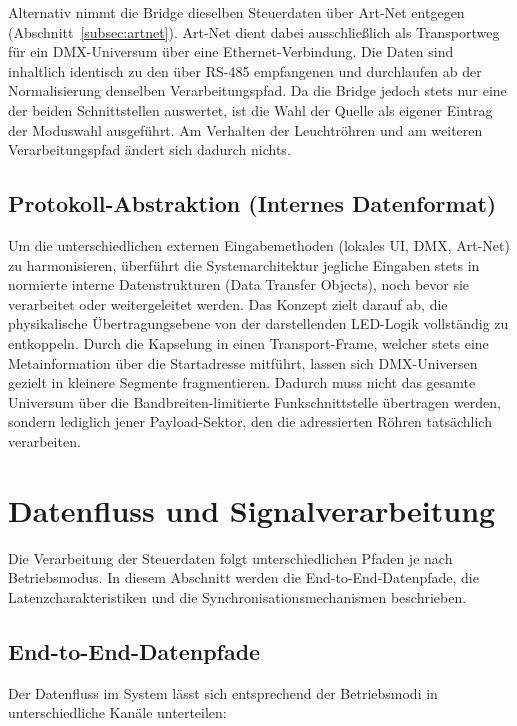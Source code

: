 Alternativ nimmt die Bridge dieselben Steuerdaten über Art-Net entgegen
(Abschnitt~\ref{subsec:artnet}). Art-Net dient dabei ausschließlich als
Transportweg für ein DMX-Universum über eine Ethernet-Verbindung. Die Daten sind
inhaltlich identisch zu den über RS-485 empfangenen und durchlaufen ab der
Normalisierung denselben Verarbeitungspfad. Da die Bridge jedoch stets nur eine der beiden
Schnittstellen auswertet, ist die Wahl der Quelle als eigener Eintrag der Moduswahl
ausgeführt. Am Verhalten der Leuchtröhren und am weiteren Verarbeitungspfad ändert sich
dadurch nichts.

\subsection{Protokoll-Abstraktion (Internes Datenformat)}
\label{subsec:internes-protokoll}

Um die unterschiedlichen externen Eingabemethoden (lokales UI, DMX, Art-Net) zu harmonisieren, überführt die Systemarchitektur 
jegliche Eingaben stets in normierte interne Datenstrukturen (Data Transfer Objects), noch bevor sie verarbeitet oder weitergeleitet werden. 
Das Konzept zielt darauf ab, die physikalische Übertragungsebene von der darstellenden LED-Logik vollständig zu entkoppeln.
Durch die Kapselung in einen Transport-Frame, welcher stets eine Metainformation über die Startadresse mitführt, 
lassen sich DMX-Universen gezielt in kleinere Segmente fragmentieren. 
Dadurch muss nicht das gesamte Universum über die Bandbreiten-limitierte Funkschnittstelle übertragen werden, 
sondern lediglich jener Payload-Sektor, den die adressierten Röhren tatsächlich verarbeiten.

\section{Datenfluss und Signalverarbeitung}
\label{sec:datenfluss-und-signalverarbeitung}

Die Verarbeitung der Steuerdaten folgt unterschiedlichen Pfaden je nach Betriebsmodus. 
In diesem Abschnitt werden die End-to-End-Datenpfade, die Latenzcharakteristiken und die 
Synchronisationsmechanismen beschrieben.

\subsection{End-to-End-Datenpfade}
\label{subsec:end-to-end-datenpfade}

Der Datenfluss im System lässt sich entsprechend der Betriebsmodi in unterschiedliche Kanäle unterteilen:

